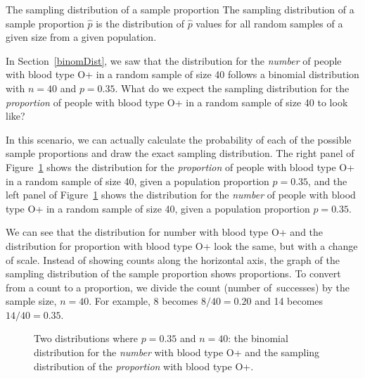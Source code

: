 \begin{onebox}{The sampling distribution of a sample proportion}
The sampling distribution of a sample proportion $\hat{p}$ is the distribution of $\hat{p}$ values for all random samples of a given size from a given population.
\end{onebox}

In Section~\ref{binomDist}, we saw that the distribution for the \emph{number} of people with blood type O+ in a random sample of size 40 follows a binomial distribution with $n=40$ and $p=0.35$.  What do we expect the sampling distribution for the \emph{proportion} of people with blood type O+ in a random sample of size 40 to look like? 

\newpage
In this scenario, we can actually calculate the probability of each of the possible sample proportions and draw the exact sampling distribution.  The right panel of Figure~\ref{oPositive40} shows the distribution for the \emph{proportion} of people with blood type O+ in a random sample of size 40, given a population proportion $p=0.35$, and the left panel of Figure~\ref{oPositive40} shows the distribution for the \emph{number} of people with blood type O+ in a random sample of size 40, given a population proportion $p=0.35$.

We can see that the distribution for number with blood type O+ and the distribution for proportion with blood type O+ look the same, but with a change of scale.  Instead of showing counts along the horizontal axis, the graph of the sampling distribution of the sample proportion shows proportions.  To convert from a count to a proportion, we divide the count (number of~successes) by the sample size, $n = 40$. For example, 8 becomes $8/40 = 0.20$ and 14 becomes $14/40 = 0.35$.   

\begin{figure}[ht]
\centering
{}
\quad
{}

\caption{Two distributions where $p=0.35$ and $n=40$:  the binomial distribution for the \emph{number} with blood type O+ and the sampling distribution of the \emph{proportion} with blood type O+. }
\label{oPositive40}
\end{figure}

